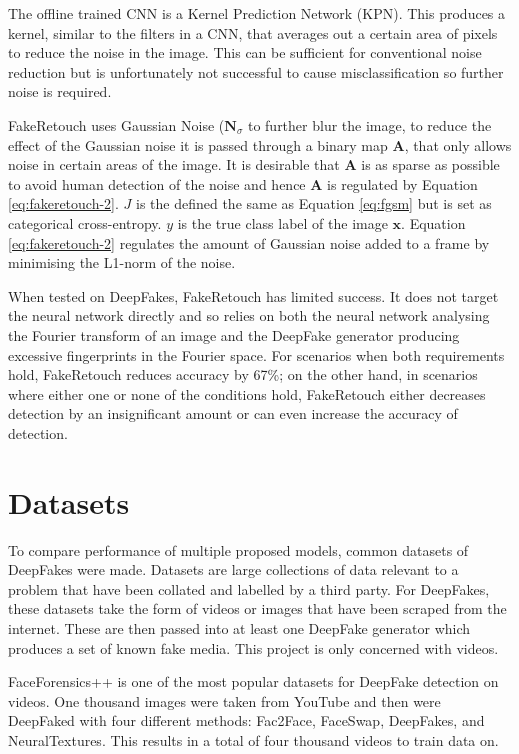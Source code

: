 The offline trained CNN is a Kernel Prediction Network (KPN)\cite{mildenhall2018burst}. This produces a kernel, similar to the filters in a CNN, that averages out a certain area of pixels to reduce the noise in the image. This can be sufficient for conventional noise reduction but is unfortunately not successful to cause misclassification\cite{huang2020fakeretouch} so further noise is required.

FakeRetouch uses Gaussian Noise ($\textbf{N}_{\sigma}$ to further blur the image, to reduce the effect of the Gaussian noise it is passed through a binary map $\textbf{A}$, that only allows noise in certain areas of the image. It is desirable that $\textbf{A}$ is as sparse as possible to avoid human detection of the noise and hence $\textbf{A}$ is regulated by Equation \ref{eq:fakeretouch-2}. $J$ is the defined the same as Equation \ref{eq:fgsm} but is set as categorical cross-entropy. $y$ is the true class label of the image $\textbf{x}$. Equation \ref{eq:fakeretouch-2} regulates the amount of Gaussian noise added to a frame by minimising the L1-norm of the noise.

When tested on DeepFakes, FakeRetouch has limited success. It does not target the neural network directly and so relies on both the neural network analysing the Fourier transform of an image and the DeepFake generator producing excessive fingerprints in the Fourier space. For scenarios when both requirements hold, FakeRetouch reduces accuracy by 67\%; on the other hand, in scenarios where either one or none of the conditions hold, FakeRetouch either decreases detection by an insignificant amount or can even increase the accuracy of detection.

\section{Datasets}

To compare performance of multiple proposed models, common datasets of DeepFakes were made. Datasets are large collections of data relevant to a problem that have been collated and labelled by a third party. For DeepFakes, these datasets take the form of videos or images that have been scraped from the internet. These are then passed into at least one DeepFake generator which produces a set of known fake media. This project is only concerned with videos.

FaceForensics++\cite{roessler2018faceforensics}\cite{roessler2019faceforensicspp} is one of the most popular datasets for DeepFake detection on videos. One thousand images were taken from YouTube and then were DeepFaked with four different methods: Fac2Face\cite{thies2016face2face}, FaceSwap\cite{kowalski2016faceswap}, DeepFakes\cite{deepfakes}, and NeuralTextures\cite{thies2019deferred}. This results in a total of four thousand videos to train data on. 

